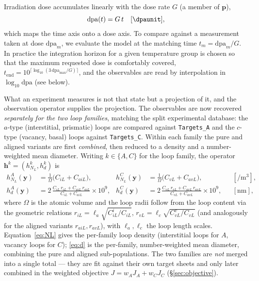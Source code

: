 \documentclass{article}
\newcommand{\param}{\bm{p}}
\newcommand{\dpa}{\mathrm{dpa}}
\newcommand{\NL}{N_{L}}
\begin{document}
Irradiation dose accumulates linearly with the dose rate $G$ (a member of $\param$),
\begin{equation}
  \dpa(t)=G\,t \quad[\si{\dpaunit}],
  \label{eq:dose}
\end{equation}
which maps the time axis onto a dose axis. To compare against a measurement taken
at dose $\dpa_m$, we evaluate the model at the matching time $t_m=\dpa_m/G$. In
practice the integration horizon for a given temperature group is chosen so that
the maximum requested dose is comfortably covered,
\(t_{\mathrm{end}}=10^{\lceil \log_{10}(3\,\dpa_{\max}/G)\rceil}\), and the
observables are read by interpolation in $\log_{10}\dpa$ (see below).

What an experiment measures is not that state but a projection of it, and the
observation operator supplies the projection. The observables are now recovered \emph{separately for the two loop families},
matching the split experimental database: the $a$-type (interstitial, prismatic)
loops are compared against \texttt{Targets\_A} and the $c$-type (vacancy, basal)
loops against \texttt{Targets\_C}. Within each family the pure and aligned
variants are first \emph{combined}, then reduced to a density and a
number-weighted mean diameter. Writing $k\in\{A,C\}$ for the loop family, the
operator $\bm{h}^{k}=(h^{k}_{\NL},h^{k}_{d})$ is
\begin{align}
  h^{A}_{\NL}(\bm{y}) &= \frac{1}{\Omega}\big(C_{iL}+C_{aiL}\big),
  & h^{C}_{\NL}(\bm{y}) &= \frac{1}{\Omega}\big(C_{vL}+C_{avL}\big),
  &&[\si{\per\cubic\metre}], \label{eq:NL}\\[4pt]
  h^{A}_{d}(\bm{y}) &= 2\,\frac{C_{iL}\,r_{iL}+C_{aiL}\,r_{aiL}}{C_{iL}+C_{aiL}}\times 10^{9},
  & h^{C}_{d}(\bm{y}) &= 2\,\frac{C_{vL}\,r_{vL}+C_{avL}\,r_{avL}}{C_{vL}+C_{avL}}\times 10^{9},
  &&[\si{\nano\metre}], \label{eq:d}
\end{align}
where $\Omega$ is the atomic volume and the loop radii follow from the loop
content via the geometric relations
\(r_{iL}=\ell_a\sqrt{C_{iL}^{i}/C_{iL}}\),
\(r_{vL}=\ell_c\sqrt{C_{vL}^{v}/C_{vL}}\) (and analogously for the aligned
variants $r_{aiL},r_{avL}$), with $\ell_a,\ell_c$ the loop length scales.
Equation~\eqref{eq:NL} gives the per-family loop density (interstitial loops for
$A$, vacancy loops for $C$); \eqref{eq:d} is the per-family, number-weighted mean
diameter, combining the pure and aligned sub-populations. The two families are
\emph{not} merged into a single total --- they are fit against their own target
sheets and only later combined in the weighted objective $J=w_AJ_A+w_CJ_C$
(\S\ref{sec:objective}).
\end{document}
